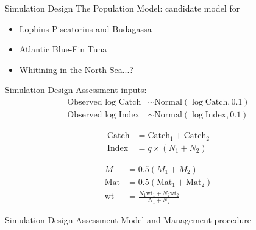 \documentclass{beamer}
\begin{document}
\begin{withoutheadline}
\begin{frame}{Simulation Design}
  The Population Model: candidate model for
  \begin{itemize}
    \item Lophius Piscatorius and Budagassa
    \item Atlantic Blue-Fin Tuna
    \item Whitining in the North Sea...?
  \end{itemize}
\end{frame}
\end{withoutheadline}





\begin{withoutheadline}
\begin{frame}{Simulation Design}
  Assessment inputs:
  \begin{align*}
    \text{Observed log Catch} &\sim \text{Normal}(\log \text{Catch}, 0.1) \\
    \text{Observed log Index} &\sim \text{Normal}(\log \text{Index}, 0.1)
  \end{align*}
  \begin{minipage}{0.4\textwidth}
  \begin{align*}
    \text{Catch} &= \text{Catch}_1 + \text{Catch}_2 \\
    \text{Index} &= q \times (N_1 + N_2)
  \end{align*}
  \end{minipage}
  \begin{minipage}{0.4\textwidth}
  \begin{align*}
    M &= 0.5 (M_1 + M_2) \\
    \text{Mat} &= 0.5 (\text{Mat}_1 + \text{Mat}_2) \\
    \text{wt} &= \frac{N_1 \text{wt}_1 + N_2 \text{wt}_2 }{N_1 + N_2}
  \end{align*}
  \end{minipage}
\end{frame}
\end{withoutheadline}

\begin{withoutheadline}
\begin{frame}{Simulation Design}
  Assessment Model and Management procedure
\end{frame}
\end{withoutheadline}
\end{document}
